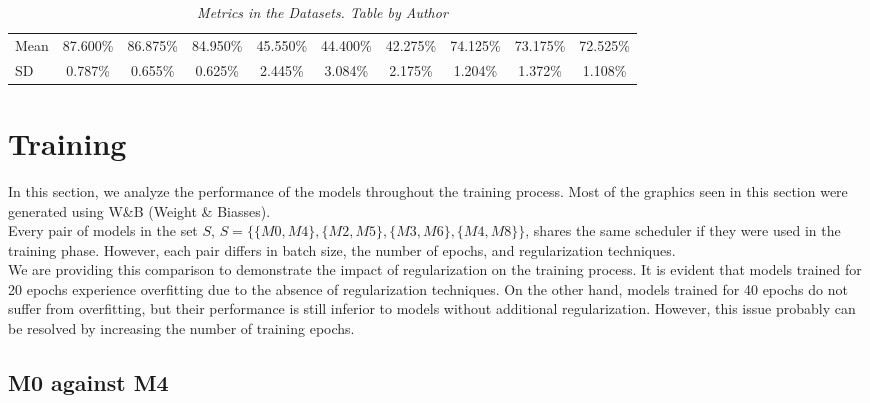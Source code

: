 \begin{landscape}
\begin{table}
\begin{tabular}{lccccccccc}
\midrule

\cellcolor{gray!50}Mean & \cellcolor{gray!50}87.600\% & \cellcolor{gray!50}86.875\% & \cellcolor{gray!50}84.950\% & \cellcolor{gray!50}45.550\% & \cellcolor{gray!50}44.400\% & \cellcolor{gray!50}42.275\% & \cellcolor{gray!50}74.125\% & \cellcolor{gray!50}73.175\% & \cellcolor{gray!50}72.525\% \\
\cellcolor{gray!50}SD & \cellcolor{gray!50}0.787\% & \cellcolor{gray!50}0.655\% & \cellcolor{gray!50}0.625\% & \cellcolor{gray!50}2.445\% & \cellcolor{gray!50}3.084\% & \cellcolor{gray!50}2.175\% & \cellcolor{gray!50}1.204\% & \cellcolor{gray!50}1.372\% &  \cellcolor{gray!50}1.108\% \\

\bottomrule
\end{tabular}
\caption[Metrics in the Datasets]
  {\textit{Metrics in the Datasets. Table by Author}}
{\label{table:resume-metrics}}
\end{table}

\end{landscape}


\section{Training}

In this section, we analyze the performance of the models throughout the training process.
Most of the graphics seen in this section were generated using W\&B (Weight \& Biasses).\\


Every pair of models in the set \(S\), \(S=\{\{M0, M4\}, \{M2, M5\}, \{M3, M6\}, \{M4, M8\}\}\),
shares the same scheduler if they were used in the training phase.
However, each pair differs in batch size, the number of epochs, and regularization techniques. \\

We are providing this comparison to demonstrate the impact of regularization on the training process.
It is evident that models trained for 20 epochs experience overfitting due to the absence of regularization techniques. On the other hand,
models trained for 40 epochs do not suffer from overfitting,
but their performance is still inferior to models without additional regularization. However,
this issue probably can be resolved by increasing the number of training epochs.

\subsection{M0 against M4}

